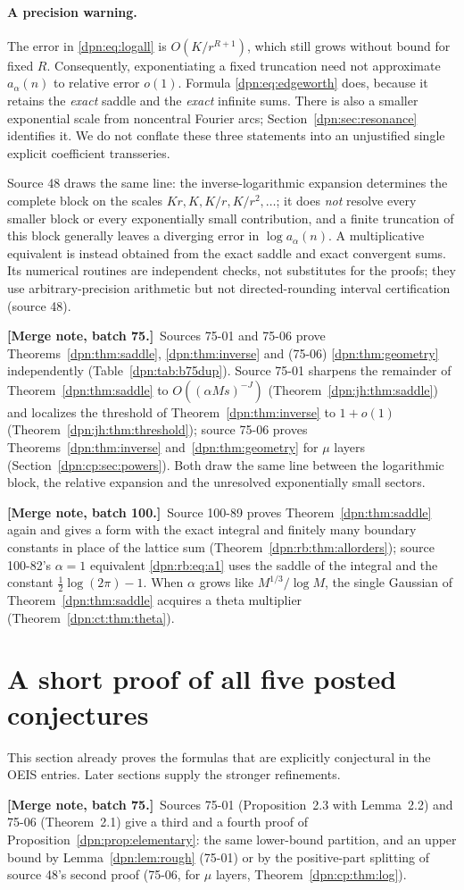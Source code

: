 \documentclass[11pt]{article}
\numberwithin{equation}{section}
\theoremstyle{definition}\newtheorem{definition}[theorem]{Definition}
\theoremstyle{remark}\newtheorem{remark}[theorem]{Remark}
\newcommand{\src}[1]{\textup{(source #1)}}
\newcommand{\mergenoteb}[1]{\par\smallskip\noindent\textbf{[Merge note, batch 75.]}\ #1\par\smallskip}
\newcommand{\mergenoted}[1]{\par\smallskip\noindent\textbf{[Merge note, batch 100.]}\ #1\par\smallskip}
\begin{document}
\paragraph{A precision warning.}
The error in \eqref{dpn:eq:logall} is $O(K/r^{R+1})$, which still grows without
bound for fixed $R$. Consequently, exponentiating a fixed truncation need not
approximate $a_\alpha(n)$ to relative error $o(1)$. Formula
\eqref{dpn:eq:edgeworth} does, because it retains the \emph{exact} saddle and the
\emph{exact} infinite sums. There is also a smaller exponential scale from
noncentral Fourier arcs; Section~\ref{dpn:sec:resonance} identifies it. We do not
conflate these three statements into an unjustified single explicit
coefficient transseries.

Source 48 draws the same line: the inverse-logarithmic expansion determines
the complete block on the scales $Kr,K,K/r,K/r^2,\ldots$; it does \emph{not}
resolve every smaller block or every exponentially small contribution, and a
finite truncation of this block generally leaves a diverging error in
$\log a_\alpha(n)$.  A multiplicative equivalent is instead obtained from the
exact saddle and exact convergent sums.  Its numerical routines are
independent checks, not substitutes for the proofs; they use
arbitrary-precision arithmetic but not directed-rounding interval
certification \src{48}.
\mergenoteb{Sources 75-01 and 75-06 prove Theorems~\ref{dpn:thm:saddle},
\ref{dpn:thm:inverse} and (75-06) \ref{dpn:thm:geometry} independently
(Table~\ref{dpn:tab:b75dup}).  Source 75-01 sharpens the remainder of
Theorem~\ref{dpn:thm:saddle} to $O((\alpha Ms)^{-J})$
(Theorem~\ref{dpn:jh:thm:saddle}) and localizes the threshold of
Theorem~\ref{dpn:thm:inverse} to $1+o(1)$
(Theorem~\ref{dpn:jh:thm:threshold}); source 75-06 proves
Theorems~\ref{dpn:thm:inverse} and~\ref{dpn:thm:geometry} for $\mu$ layers
(Section~\ref{dpn:cp:sec:powers}).  Both draw the same line between the
logarithmic block, the relative expansion and the unresolved exponentially
small sectors.}
\mergenoted{Source 100-89 proves Theorem~\ref{dpn:thm:saddle} again and gives
a form with the exact integral and finitely many boundary constants in place
of the lattice sum (Theorem~\ref{dpn:rb:thm:allorders}); source 100-82's
$\alpha=1$ equivalent \eqref{dpn:rb:eq:a1} uses the saddle of the integral and
the constant $\frac12\log(2\pi)-1$.  When $\alpha$ grows like
$M^{1/3}/\log M$, the single Gaussian of Theorem~\ref{dpn:thm:saddle} acquires a
theta multiplier (Theorem~\ref{dpn:ct:thm:theta}).}

\section{A short proof of all five posted conjectures}
This section already proves the formulas that are explicitly conjectural in the
OEIS entries. Later sections supply the stronger refinements.
\mergenoteb{Sources 75-01 (Proposition~2.3 with Lemma~2.2) and 75-06
(Theorem~2.1) give a third and a fourth proof of
Proposition~\ref{dpn:prop:elementary}: the same lower-bound partition, and an
upper bound by Lemma~\ref{dpn:lem:rough} (75-01) or by the positive-part
splitting of source 48's second proof (75-06, for $\mu$ layers,
Theorem~\ref{dpn:cp:thm:log}).}
\end{document}
